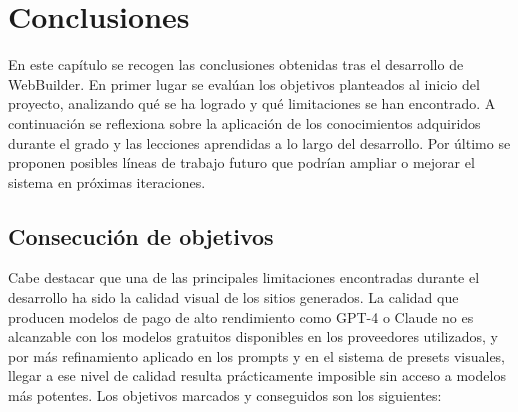 
\cleardoublepage
\chapter{Conclusiones}
\label{chap:conclusiones}

En este capítulo se recogen las conclusiones obtenidas tras el desarrollo de WebBuilder. En primer lugar se evalúan los objetivos planteados al inicio del proyecto, analizando qué se ha logrado y qué limitaciones se han encontrado. A continuación se reflexiona sobre la aplicación de los conocimientos adquiridos durante el grado y las lecciones aprendidas a lo largo del desarrollo. Por último se proponen posibles líneas de trabajo futuro que podrían ampliar o mejorar el sistema en próximas iteraciones.

\section{Consecución de objetivos}
\label{sec:consecucion-objetivos}

%

Cabe destacar que una de las principales limitaciones encontradas durante el desarrollo ha sido la calidad visual de los sitios generados. La calidad que producen modelos de pago de alto rendimiento como GPT-4 o Claude no es alcanzable con los modelos gratuitos disponibles en los proveedores utilizados, y por más refinamiento aplicado en los prompts y en el sistema de presets visuales, llegar a ese nivel de calidad resulta prácticamente imposible sin acceso a modelos más potentes. Los objetivos marcados y conseguidos son los siguientes: 

